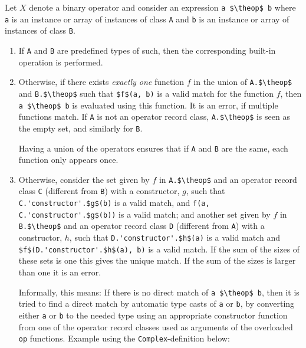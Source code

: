 \newcommand{\theop}{X}

Let $\theop$ denote a binary operator and consider an expression
\lstinline!a $\theop$ b! where \lstinline!a! is an instance or array of instances of
class \lstinline!A! and \lstinline!b! is an instance or array of instances of
class \lstinline!B!.

\begin{enumerate}
\item\label{overloaded-binary-predefined}
  If \lstinline!A! and \lstinline!B! are predefined types of such, then the corresponding built-in operation is performed.
\item
  Otherwise, if there exists \emph{exactly one} function $f$ in the
  union of \lstinline!A.$\theop$! and \lstinline!B.$\theop$! such that
  \lstinline!$f$(a, b)! is a valid match for the function $f$, then
  \lstinline!a $\theop$ b! is evaluated using this function. It is an error, if
  multiple functions match. If \lstinline!A! is not an operator record class, \lstinline!A.$\theop$!
  is seen as the empty set, and similarly for \lstinline!B!.
  \begin{nonnormative}
  Having a union of the operators ensures that if \lstinline!A! and \lstinline!B! are the same, each function only appears once.
  \end{nonnormative}
\item
  Otherwise, consider the set given by $f$ in \lstinline!A.$\theop$!
  and an operator record class \lstinline!C! (different from \lstinline!B!) with a
  constructor, $g$, such that \lstinline!C.'constructor'.$g$(b)! is a valid match, and
  \lstinline!f(a, C.'constructor'.$g$(b))! is a valid match; and another set given by
  $f$ in \lstinline!B.$\theop$! and an operator record class \lstinline!D!
  (different from \lstinline!A!) with a constructor, $h$, such that
  \lstinline!D.'constructor'.$h$(a)! is a valid match and \lstinline!$f$(D.'constructor'.$h$(a), b)!
  is a valid match. If the sum of the sizes of these sets is one this
  gives the unique match. If the sum of the sizes is larger than one it
  is an error.
\begin{nonnormative}
  Informally, this means: If there is no direct match of \lstinline!a $\theop$ b!, then it is tried to find a direct match by automatic type casts of \lstinline!a! or \lstinline!b!, by converting either \lstinline!a! or \lstinline!b! to the needed type using an appropriate constructor function from one of the operator record classes used as arguments of the overloaded \lstinline!op! functions.  Example using the \lstinline!Complex!-definition below:

\end{nonnormative}
\end{enumerate}
